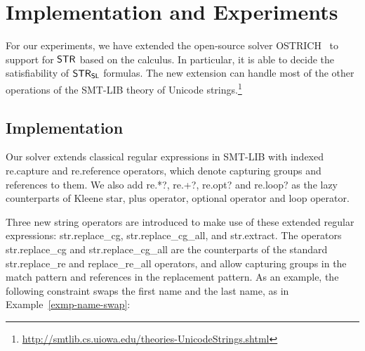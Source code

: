 
\section{Implementation and Experiments}
\label{sect:impl}


For our experiments, we have extended the open-source solver
OSTRICH~\cite{CHL+19} to support for $\mathsf{STR}$ %
based on the calculus. In particular, it is able to decide the satisfiability of
$\mathsf{STR}_{\mathsf{SL}}$ formulas. 
The new extension can handle most of the
other operations of the SMT-LIB theory of Unicode
strings.\footnote{\url{http://smtlib.cs.uiowa.edu/theories-UnicodeStrings.shtml}}



\subsection{Implementation}

Our solver extends classical regular expressions in SMT-LIB
with indexed {\sf re.capture} and {\sf re.reference} operators, which
denote capturing groups and references to them. We also add {\sf re.*?}, {\sf re.+?}, {\sf re.opt?} and {\sf re.loop?} as the lazy counterparts of
Kleene star, plus operator, optional operator and loop operator.

Three new string operators are introduced to make use of these extended regular
expressions: {\sf str.replace\_cg}, {\sf str.replace\_cg\_all}, and
{\sf str.extract}. The operators {\sf str.replace\_cg} and {\sf
  str.replace\_cg\_all} are the counterparts of the standard {\sf
  str.replace\_re} and {\sf replace\_re\_all} operators, and allow
capturing groups in the match pattern and references in the
replacement pattern. As an example, the following constraint swaps the
first name and the last name, as in Example~\ref{exmp-name-swap}:


